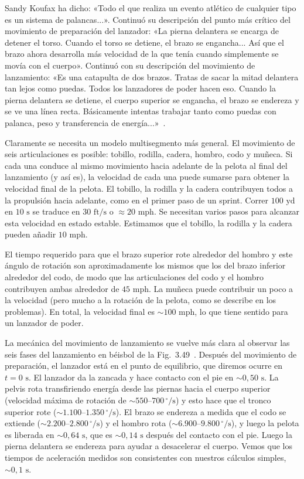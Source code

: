 \documentclass[12pt]{book}
\begin{document}
Sandy Koufax ha dicho: «Todo el que realiza un evento atlético de cualquier tipo es un sistema de palancas...». Continuó su descripción del punto más crítico del movimiento de preparación del lanzador: «La pierna delantera se encarga de detener el torso. Cuando el torso se detiene, el brazo se engancha... Así que el brazo ahora desarrolla más velocidad de la que tenía cuando simplemente se movía con el cuerpo». Continuó con su descripción del movimiento de lanzamiento: «Es una catapulta de dos brazos. Tratas de sacar la mitad delantera tan lejos como puedas. Todos los lanzadores de poder hacen eso. Cuando la pierna delantera se detiene, el cuerpo superior se engancha, el brazo se endereza y se ve una línea recta. Básicamente intentas trabajar tanto como puedas con palanca, peso y transferencia de energía...»~\cite{ref81}.

Claramente se necesita un modelo multisegmento más general. El movimiento de seis articulaciones es posible: tobillo, rodilla, cadera, hombro, codo y muñeca. Si cada una conduce al mismo movimiento hacia adelante de la pelota al final del lanzamiento (y así es), la velocidad de cada una puede sumarse para obtener la velocidad final de la pelota. El tobillo, la rodilla y la cadera contribuyen todos a la propulsión hacia adelante, como en el primer paso de un sprint. Correr $100\text{ yd}$ en $10\text{ s}$ se traduce en $30\text{ ft/s}$ o $\approx 20\text{ mph}$. Se necesitan varios pasos para alcanzar esta velocidad en estado estable. Estimamos que el tobillo, la rodilla y la cadera pueden añadir $10\text{ mph}$.

El tiempo requerido para que el brazo superior rote alrededor del hombro y este ángulo de rotación son aproximadamente los mismos que los del brazo inferior alrededor del codo, de modo que las articulaciones del codo y el hombro contribuyen ambas alrededor de $45\text{ mph}$. La muñeca puede contribuir un poco a la velocidad (pero mucho a la rotación de la pelota, como se describe en los problemas). En total, la velocidad final es $\sim 100\text{ mph}$, lo que tiene sentido para un lanzador de poder.

La mecánica del movimiento de lanzamiento se vuelve más clara al observar las seis fases del lanzamiento en béisbol de la Fig.~3.49~\cite{ref109,ref146}. Después del movimiento de preparación, el lanzador está en el punto de equilibrio, que diremos ocurre en $t = 0\text{ s}$. El lanzador da la zancada y hace contacto con el pie en $\sim 0{,}50\text{ s}$. La pelvis rota transfiriendo energía desde las piernas hacia el cuerpo superior (velocidad máxima de rotación de $\sim 550$--$700\,^\circ/\text{s}$) y esto hace que el tronco superior rote ($\sim 1.100$--$1.350\,^\circ/\text{s}$). El brazo se endereza a medida que el codo se extiende ($\sim 2.200$--$2.800\,^\circ/\text{s}$) y el hombro rota ($\sim 6.900$--$9.800\,^\circ/\text{s}$), y luego la pelota es liberada en $\sim 0{,}64\text{ s}$, que es $\sim 0{,}14\text{ s}$ después del contacto con el pie. Luego la pierna delantera se endereza para ayudar a desacelerar el cuerpo. Vemos que los tiempos de aceleración medidos son consistentes con nuestros cálculos simples, $\sim 0{,}1\text{ s}$.
\end{document}
